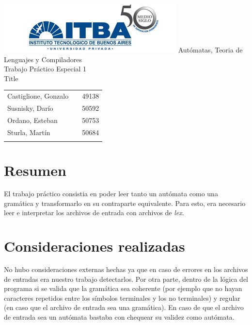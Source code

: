 \documentclass[a4paper,10pt]{article}
\begin{document}
\begin{titlepage}
	\thispagestyle{empty}
	\begin{center}
		\includegraphics[scale=0.7]{./images/itba.jpg}
		\vfill
		\Huge{Autómatas, Teoria de Lenguajes y Compiladores}\\
		\vspace{1cm}
		\huge{Trabajo Práctico Especial 1} \\
		\vspace{0.3cm}
		\huge{Title}
	\end{center}
	\vspace{2cm}
	\large{
		\begin{tabular}{lcr}
			Castiglione, Gonzalo & & 49138 \\
			Susnisky, Darío & & 50592 \\
			Ordano, Esteban & & 50753 \\
			Sturla, Martín & & 50684 \\
			\\ 
		\end{tabular}
	}
	\vfill
	\flushright{\today}
\end{titlepage}

\newpage


	\thispagestyle{empty}
\tableofcontents

\newpage

\setcounter{page}{1}

\newpage

\section{Resumen}
El trabajo práctico consistia en poder leer tanto un autómata como una gramática y transformarlo en su contraparte
 equivalente. Para esto, era necesario leer e interpretar los archivos de entrada con archivos de \textit{lex}.

\newpage

\section{Consideraciones realizadas}
    No hubo consideraciones externas hechas ya que en caso de errores en los archivos de entradas era nuestro trabajo
     detectarlos. Por otra parte, dentro de la lógica del programa si se valida que la gramática sea coherente 
      (por ejemplo que no hayan caracteres repetidos entre los símbolos terminales y los no terminales) y regular
      (en caso que el archivo de entrada sea una gramática). En caso de que el archivo de entrada sea un autómata
      bastaba con chequear su validez como autómata.
\end{document}
